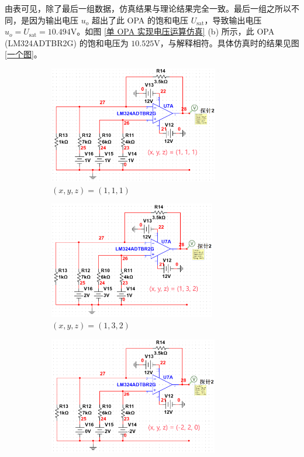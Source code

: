 \documentclass[UTF8]{report}
\theoremstyle{MyLineTheoremStyle} %
\theoremstyle{MyBlockTheoremStyle} %
\theoremstyle{MySubsubsectionStyle} %
\begin{document}
由表可见，除了最后一组数据，仿真结果与理论结果完全一致。最后一组之所以不同，是因为输出电压 $u_o$ 超出了此 OPA 的饱和电压 $U_{\text{sat}}$，导致输出电压 $u_o = U_{\text{sat}} = 10.494 \mathrm{V}$。如图 \ref{单 OPA 实现电压运算仿真} (b) 所示，此 OPA (LM324ADTBR2G) 的饱和电压为 $10.525 \mathrm{V}$，与解释相符。具体仿真时的结果见图 \ref{一个图}。

\begin{figure}[H]\centering
\begin{subfigure}[t]{0.48\textwidth}\centering
    \includegraphics[height=145pt]{assets/3/111.png}
    \caption{\bfseries $(x,y,z) = (1,1,1)$ }
\end{subfigure}\begin{subfigure}[t]{0.48\textwidth}\centering
    \includegraphics[height=145pt]{assets/3/132.png}
    \caption{\bfseries $(x,y,z) = (1,3,2)$ }
\end{subfigure}
\begin{subfigure}[t]{0.48\textwidth}\centering
    \includegraphics[height=145pt]{assets/3/91f965079537c7c35944182511dce291.png}

\end{subfigure}
\end{figure}
\end{document}
